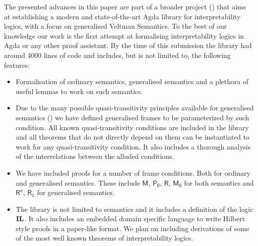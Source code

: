 \documentclass[twoside]{aiml20}
\newcommand{\il}{\ensuremath{\textup{\textbf{IL}}}\xspace}
\newcommand{\principle}[1]{\text{$\mathsf{#1}$}}
\newcommand{\jan}[1]{\textcolor{orange}{\bf Jan: #1}}
\newcommand{\luka}[1]{\textcolor{blue}{\bf Luka: #1}}
\begin{document}
The presented advances in this paper are part of a
broader project (\cite{MasRovira:2020:MastersThesis}) that aims at establishing
a modern and state-of-the-art Agda library for interpretability logics, with a
focus on generalised Veltman Semantics. To the best of our knowledge our work is the first
attempt at formalising interpretability logics in Agda or any other proof
assistant. By the time of this submission the library had around 4000 lines of code and
includes, but is not limited to, the following features:
\begin{itemize}[nosep]
\item Formalisation of ordinary semantics, generalised semantics
  and a plethora of useful lemmas to work on such semantics.
\item Due to the many possible quasi-transitivity principles available for generalised
  semantics (\cite{joosten2020overview}) we have defined generalised frames to be
  parameterized by such condition. All known quasi-transitivity conditions are
  included in the library and all theorems that do not directly depend on them can
  be instantiated to work for any quasi-transitivity condition. It also includes
  a thorough analysis of the interrelations between the alluded conditions.
\item We have included proofs for a number of frame conditions. Both for
  ordinary and generalised semantics. These include $\principle{M}$,
  $\principle{P_0}$, $\principle{R}$, $\principle{M_0}$ for both semantics and
  $\principle{R^n}$, $\principle{R_1}$ for generalised semantics.
\item The library is not limited to semantics and it includes a definition of
  the logic \il{}. 
  It also includes an embedded domain specific language to
  write Hilbert style proofs in a paper-like format. We plan on including derivations
  of some of the most well known theorems of interpretability logics.

\end{itemize}
\end{document}
